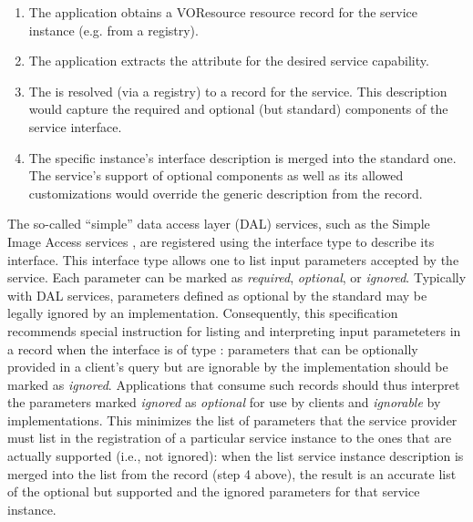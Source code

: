 \documentclass[11pt,a4paper]{ivoa}
\begin{document}
\begin{enumerate}

\item  The application obtains a VOResource resource record for the
       service instance (e.g. from a registry).

\item  The application extracts the  attribute
       for the desired service capability.

\item  The  is resolved (via a registry) to a
        record for the service.  This
       description would capture the required and optional (but
       standard) components of the service interface.

\item  The specific instance's interface description is merged into
       the standard one.  The service's support of optional components
       as well as its allowed customizations would override the
       generic description from the 
       record.

\end{enumerate}

The so-called ``simple'' data access layer (DAL) services, such as the
Simple Image Access services \citep{2015ivoa.spec.1223D}, are
registered using the  interface type
\citep{2021ivoa.spec.1102D}
to describe its interface.  This interface
type allows one to list input parameters accepted by the service.
Each parameter can be marked as \emph{required}, \emph{optional},
or \emph{ignored}.  Typically with DAL services, parameters defined
as optional by the standard may be legally ignored by an
implementation.  Consequently, this specification recommends special
instruction for listing and interpreting input parameteters in a
 record when the interface is of type
:  parameters that can be optionally provided
in a client's query but are ignorable by the implementation should be
marked as \emph{ignored}.  Applications that consume such 
 records should thus interpret the
parameters marked \emph{ignored} as \emph{optional} for use by
clients and \emph{ignorable} by implementations.  This minimizes the
list of parameters that the service provider must list in the
registration of a particular service instance to the ones that are
actually supported (i.e., not ignored): when the list service
instance description is merged into the list from the 
 record (step 4 above), the result is
an accurate list of the optional but supported and the ignored
parameters for that service instance.
\end{document}
